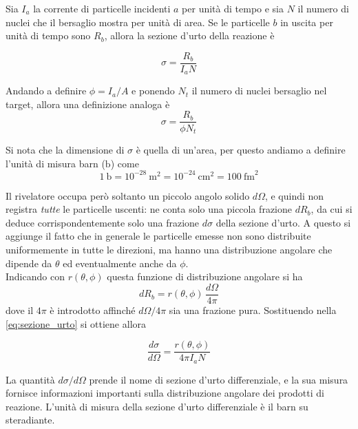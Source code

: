 Sia $I_a$ la corrente di particelle incidenti $a$ per unità di tempo e sia $N$ il numero di nuclei che il bersaglio mostra per unità di area. Se le particelle $b$ in uscita per unità di tempo sono $R_b$, allora la sezione d'urto della reazione è
\begin{tcolorbox}[colback=black!5!white, colframe=black!45!white, boxrule=0.8pt]
\begin{equation}
\label{eq:sezione_urto}
    \sigma = \frac{R_b}{I_a N}
\end{equation}
\end{tcolorbox}

Andando a definire $\phi = I_a/A$ e ponendo $N_t$ il numero di nuclei bersaglio nel target, allora una definizione analoga è 
\begin{equation}
    \sigma = \frac{R_b}{\phi N_t}
\end{equation}

Si nota che la dimensione di $\sigma$ è quella di un'area, per questo andiamo a definire l'unità di misura barn ($\text{b}$) come 
\begin{equation*}
    1\ \text{b} = 10^{-28} \ \text{m}^2 = 10^{-24} \ \text{cm}^2 = 100 \ \text{fm} ^2
\end{equation*}

Il rivelatore occupa però soltanto un piccolo angolo solido $d\Omega$, e quindi non registra \emph{tutte} le particelle uscenti: ne conta solo una piccola frazione $dR_b$, da cui si deduce corrispondentemente solo una frazione $d\sigma$ della sezione d'urto. A questo si aggiunge il fatto che in generale le particelle emesse non sono distribuite uniformemente in tutte le direzioni, ma hanno una distribuzione angolare che dipende da $\theta$ ed eventualmente anche da $\phi$.\\

Indicando con $r(\theta,\phi)$ questa funzione di distribuzione angolare si ha
%
\begin{equation}
    dR_b = r(\theta,\phi)\,\frac{d\Omega}{4\pi}
    \label{eq:distribuzione_angolare}
\end{equation}
dove il $4\pi$ è introdotto affinché $d\Omega/4\pi$ sia una frazione pura. Sostituendo nella \eqref{eq:sezione_urto} si ottiene allora

\begin{tcolorbox}[colback=black!5!white, colframe=black!45!white, boxrule=0.8pt]
\begin{equation}
    \frac{d\sigma}{d\Omega} = \frac{r(\theta,\phi)}{4\pi I_a N}
    \label{eq:sezione_differenziale_def}
\end{equation}
\end{tcolorbox}
La quantità $d\sigma/d\Omega$ prende il nome di sezione d'urto differenziale, e la sua misura fornisce informazioni importanti sulla distribuzione angolare dei prodotti di reazione. L'unità di misura della sezione d'urto differenziale è il barn su steradiante.\\

